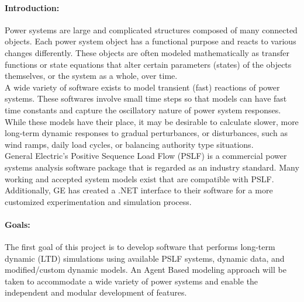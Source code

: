 \documentclass[12pt]{article}
\begin{document}
\begin{comment}
page 1 -> separte weekly talking points file.

\paragraph{Random Thoughts:}
\begin{enumerate}
\item Numerical integration at beginning of simulation may require extra care as to avoid out of index errors. -Maybe not because python can do limited negative indexing.
\end{enumerate}
\end{comment}

\paragraph{Introduction:}
Power systems are large and complicated structures composed of many connected objects. Each power system object has a functional purpose and reacts to various changes differently. These objects are often modeled mathematically as transfer functions or state equations that alter certain parameters (states) of the objects themselves, or the system as a whole, over time. \\

A wide variety of software exists to model transient (fast) reactions of power systems. These softwares involve small time steps so that models can have fast time constants and capture the oscillatory nature of power system responses. While these models have their place, it may be desirable to calculate slower, more long-term dynamic responses to gradual perturbances, or disturbances, such as wind ramps, daily load cycles, or balancing authority type situations. \\

General Electric's Positive Sequence Load Flow (PSLF) is a commercial power systems analysis software package that is regarded as an industry standard. Many working and accepted system models exist that are compatible with PSLF. Additionally, GE has created a .NET interface to their software for a more customized experimentation and simulation process. %

\paragraph{Goals:}
The first goal of this project is to develop software that performs long-term dynamic (LTD) simulations using available PSLF systems, dynamic data, and modified/custom dynamic models. An Agent Based modeling approach will be taken to accommodate a wide variety of power systems and enable the independent and modular development of features. \\
\end{document}
